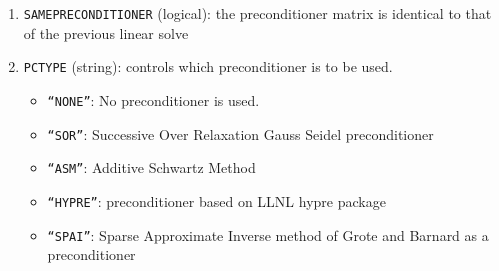 \documentclass[12pt]{amsart}
\begin{document}
\begin{enumerate}
\item {\tt SAMEPRECONDITIONER} (logical): the preconditioner matrix is identical to that of the previous linear solve
\item {\tt PCTYPE} (string): controls which preconditioner is to be used.
  \begin{itemize}
  \item {\tt ``NONE''}: No preconditioner is used.
  \item {\tt ``SOR''}: Successive Over Relaxation Gauss Seidel preconditioner
  \item {\tt ``ASM''}: Additive Schwartz Method
  \item {\tt ``HYPRE''}: preconditioner based on LLNL hypre package
  \item {\tt ``SPAI''}: Sparse Approximate Inverse method of Grote and Barnard as a preconditioner
  \end{itemize}

    

  
\end{enumerate}
\end{document}
